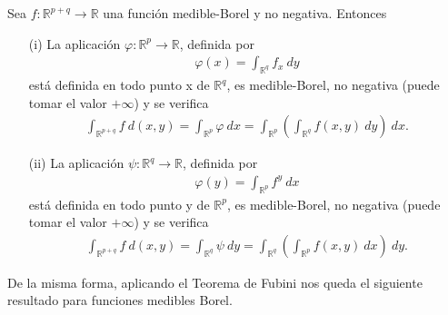 \begin{cor}
    Sea $f: \mathbb{R}^{p+q} \longrightarrow \mathbb{R}$ una función medible-Borel y no negativa. Entonces
    \begin{enumerate}
        \item[(i)] La aplicación $\varphi: \mathbb{R}^p \longrightarrow \mathbb{R}$, definida por
              \begin{align*}
                  \varphi(x) = \int_{\mathbb{R}^q}{f_x \ dy}
              \end{align*}
              está definida en todo punto x de $\mathbb{R}^q$, es medible-Borel, no negativa (puede tomar el valor $+\infty$) y se verifica
              \begin{align*}
                  \int_{\mathbb{R}^{p+q}}{f \ d(x,y)} = \int_{\mathbb{R}^p}{\varphi \ dx} = \int_{\mathbb{R}^p}\left( \int_{\mathbb{R}^q}{f(x,y) \ dy}\right) \ dx.
              \end{align*}
        \item[(ii)] La aplicación $\psi: \mathbb{R}^q \longrightarrow \mathbb{R}$, definida por
              \begin{align*}
                  \varphi(y) = \int_{\mathbb{R}^p}{f^y \ dx}
              \end{align*}
              está definida en todo punto y de $\mathbb{R}^p$, es medible-Borel, no negativa (puede tomar el valor $+\infty$) y se verifica
              \begin{align*}
                  \int_{\mathbb{R}^{p+q}}{f \ d(x,y)} = \int_{\mathbb{R}^q}{\psi \ dy} = \int_{\mathbb{R}^q}\left( \int_{\mathbb{R}^p}{f(x,y) \ dx}\right) \ dy.
              \end{align*}
    \end{enumerate}
\end{cor}

De la misma forma, aplicando el Teorema de Fubini nos queda el siguiente resultado para funciones medibles Borel.

